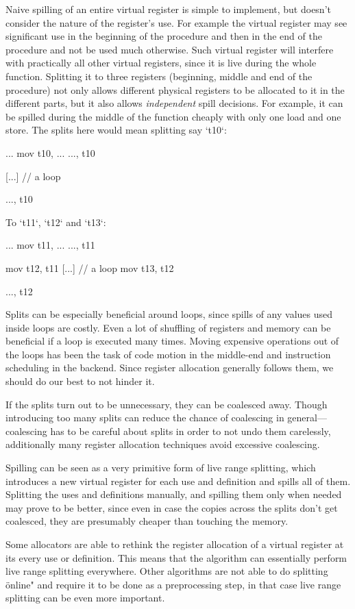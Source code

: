 Naive spilling of an entire virtual register is simple to implement, but doesn't
consider the nature of the register's use. For example the virtual register may
see significant use in the beginning of the procedure and then in the end of the
procedure and not be used much otherwise. Such virtual register will interfere
with practically all other virtual registers, since it is live during the whole
function. Splitting it to three registers (beginning, middle and end of the
procedure) not only allows different physical registers to be allocated to it in
the different parts, but it also allows {\em independent} spill decisions. For
example, it can be spilled during the middle of the function cheaply with only
one load and one store. The splits here would mean splitting say `t10`:

\begtt
...
mov t10, ...
...,  t10

[...] // a loop

..., t10
\endtt

To `t11`, `t12` and `t13`:

\begtt
...
mov t11, ...
...,  t11

mov t12, t11
[...] // a loop
mov t13, t12

..., t12
\endtt

Splits can be especially beneficial around loops, since spills of any values
used inside loops are costly. Even a lot of shuffling of registers and memory
can be beneficial if a loop is executed many times. Moving expensive operations
out of the loops has been the task of code motion in the middle-end and
instruction scheduling in the backend. Since register allocation generally
follows them, we should do our best to not hinder it.

If the splits turn out to be unnecessary, they can be coalesced away. Though
introducing too many splits can reduce the chance of coalescing in
general---coalescing has to be careful about splits in order to not undo them
carelessly, additionally many register allocation techniques avoid excessive
coalescing.

Spilling can be seen as a very primitive form of live range splitting, which
introduces a new virtual register for each use and definition and spills all of
them. Splitting the uses and definitions manually, and spilling them only when
needed may prove to be better, since even in case the copies across the splits
don't get coalesced, they are presumably cheaper than touching the memory.

Some allocators are able to rethink the register allocation of a virtual
register at its every use or definition. This means that the algorithm can
essentially perform live range splitting everywhere. Other algorithms are not
able to do splitting \"online" and require it to be done as a preprocessing
step, in that case live range splitting can be even more important.

